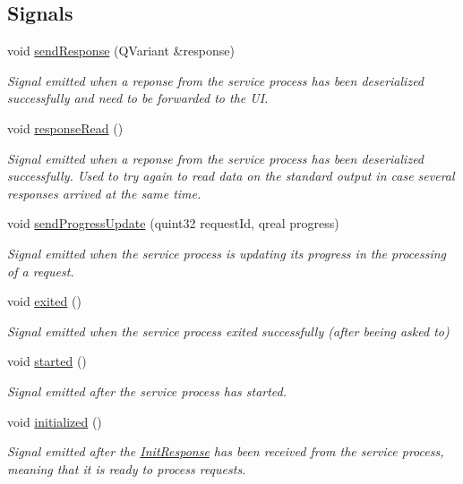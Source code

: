 \subsection*{Signals}
\begin{DoxyCompactItemize}
\item 
void \hyperlink{class_gost_crypt_1_1_core_1_1_service_handler_a12bc3e11887d1d889a097910aa9b83db}{send\+Response} (Q\+Variant \&response)
\begin{DoxyCompactList}\small\item\em Signal emitted when a reponse from the service process has been deserialized successfully and need to be forwarded to the UI. \end{DoxyCompactList}\item 
void \hyperlink{class_gost_crypt_1_1_core_1_1_service_handler_aeda23480583f6dcdb90911a82c303c85}{response\+Read} ()
\begin{DoxyCompactList}\small\item\em Signal emitted when a reponse from the service process has been deserialized successfully. Used to try again to read data on the standard output in case several responses arrived at the same time. \end{DoxyCompactList}\item 
void \hyperlink{class_gost_crypt_1_1_core_1_1_service_handler_a35d44e8648665d200a9f0cebf3d0deb7}{send\+Progress\+Update} (quint32 request\+Id, qreal progress)
\begin{DoxyCompactList}\small\item\em Signal emitted when the service process is updating its progress in the processing of a request. \end{DoxyCompactList}\item 
void \hyperlink{class_gost_crypt_1_1_core_1_1_service_handler_ac7cbfba2730adcce6f6ba3129b265e73}{exited} ()
\begin{DoxyCompactList}\small\item\em Signal emitted when the service process exited successfully (after beeing asked to) \end{DoxyCompactList}\item 
void \hyperlink{class_gost_crypt_1_1_core_1_1_service_handler_a1ac2289485ca80ad359d199c2529ec31}{started} ()
\begin{DoxyCompactList}\small\item\em Signal emitted after the service process has started. \end{DoxyCompactList}\item 
void \hyperlink{class_gost_crypt_1_1_core_1_1_service_handler_a1b4dac1bf837fe46c9c99a7e77ef7990}{initialized} ()
\begin{DoxyCompactList}\small\item\em Signal emitted after the \hyperlink{struct_gost_crypt_1_1_core_1_1_init_response}{Init\+Response} has been received from the service process, meaning that it is ready to process requests. \end{DoxyCompactList}\end{DoxyCompactItemize}
